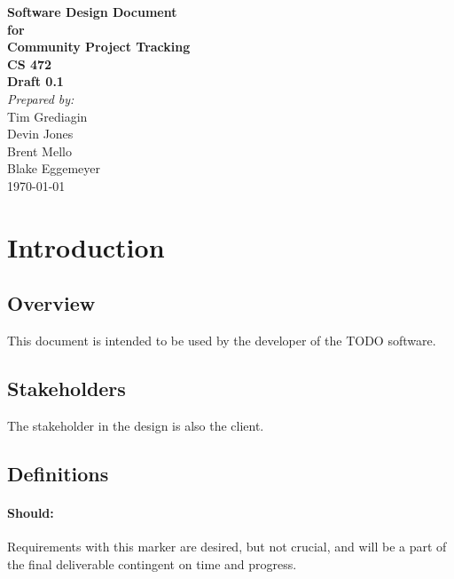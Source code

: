 \documentclass[12pt]{article}
\begin{document}

\begin{titlepage}
\begin{flushright} 
{\LARGE \bfseries Software Design Document}\\[1.2cm]
{\large \bfseries for}\\[1.2cm]
{\huge \bfseries Community Project Tracking}\\[1.2cm]
{\large \bfseries CS 472}\\
\vfill
{\large \bfseries Draft 0.1}\\[2cm]
\emph{Prepared by:} \\
Tim Grediagin\\
Devin Jones\\
Brent Mello\\
Blake Eggemeyer \\ [3cm]
{\large \today}
\\[2cm]
\end{flushright}
\end{titlepage}
\setcounter{tocdepth}{3}
\setcounter{secnumdepth}{5}
\tableofcontents
\newpage

\section{Introduction}


\subsection{Overview}
This document is intended to be used by the developer of the TODO software.

\subsection{Stakeholders}
The stakeholder in the design is also the client.

\subsection{Definitions}
\setcounter{paragraph}{0}
\setcounter{subsubsection}{0}
\paragraph{Should:} Requirements with this marker are desired, but not crucial, and will be a part of the final deliverable contingent on time and progress.
\end{document}

